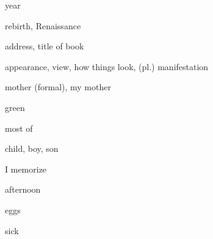 \documentclass[avery5371,grid,frame]{flashcards}
\begin{document}
\begin{flashcard}{\LARGE year}
\LARGE {}
\end{flashcard}
\begin{flashcard}{\LARGE rebirth, Renaissance}
\LARGE {}
\end{flashcard}
\begin{flashcard}{\LARGE address, title of book}
\LARGE {}
\end{flashcard}
\begin{flashcard}{\LARGE appearance, view, how things look, (pl.) manifestation}
\LARGE {}
\end{flashcard}
\begin{flashcard}{\LARGE mother (formal), my mother}
\LARGE {}
\end{flashcard}
\begin{flashcard}{\LARGE green}
\LARGE {}
\end{flashcard}
\begin{flashcard}{\LARGE most of}
\LARGE {}
\end{flashcard}
\begin{flashcard}{\LARGE child, boy, son}
\LARGE {}
\end{flashcard}
\begin{flashcard}{\LARGE I memorize}
\LARGE {}
\end{flashcard}
\begin{flashcard}{\LARGE afternoon}
\LARGE {}
\end{flashcard}
\begin{flashcard}{\LARGE eggs}
\LARGE {}
\end{flashcard}
\begin{flashcard}{\LARGE sick}
\LARGE {}
\end{flashcard}
\end{document}
